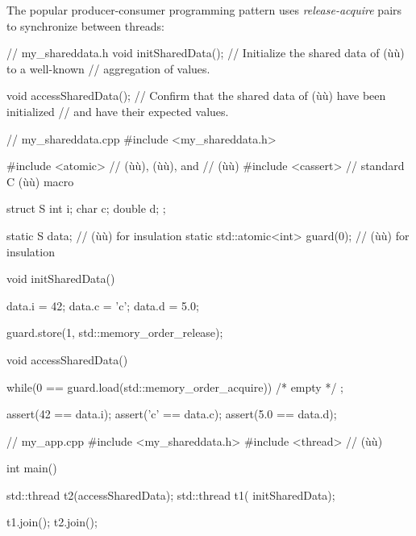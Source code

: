 The popular producer-consumer programming pattern uses
\emph{release-acquire} pairs to synchronize between threads:

%
%
%
%
\newpage%
\begin{emcppslisting}
// my_shareddata.h
void initSharedData();
    // Initialize the shared data of (ù{}ù) to a well-known
    // aggregation of values.

void accessSharedData();
    // Confirm that the shared data of (ù{}ù) have been initialized
    // and have their expected values.
\end{emcppslisting}
\vspace*{2ex}
\begin{emcppslisting}
// my_shareddata.cpp
#include <my_shareddata.h>

#include <atomic>  // (ù{}ù), (ù{}ù), and
                   // (ù{}ù)
#include <cassert> // standard C (ù{}ù) macro

struct S
{
    int    i;
    char   c;
    double d;
};

static S                data;     // (ù{}ù) for insulation
static std::atomic<int> guard(0); // (ù{}ù) for insulation

void initSharedData()
{
    data.i = 42;
    data.c = 'c';
    data.d = 5.0;

    guard.store(1, std::memory_order_release);
}

void accessSharedData()
{
    while(0 == guard.load(std::memory_order_acquire))
        /* empty */ ;

    assert(42  == data.i);
    assert('c' == data.c);
    assert(5.0 == data.d);
}
\end{emcppslisting}
\newpage%
\begin{emcppslisting}
// my_app.cpp
#include <my_shareddata.h>
#include <thread>  // (ù{}ù)

int main()
{
    std::thread t2(accessSharedData);
    std::thread t1(  initSharedData);

    t1.join();
    t2.join();
}
\end{emcppslisting}

